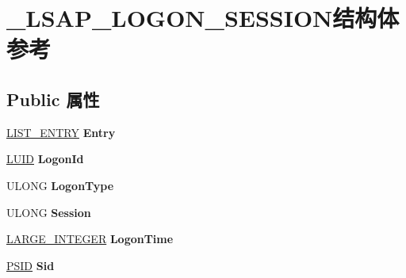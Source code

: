 \hypertarget{struct___l_s_a_p___l_o_g_o_n___s_e_s_s_i_o_n}{}\section{\+\_\+\+L\+S\+A\+P\+\_\+\+L\+O\+G\+O\+N\+\_\+\+S\+E\+S\+S\+I\+O\+N结构体 参考}
\label{struct___l_s_a_p___l_o_g_o_n___s_e_s_s_i_o_n}
\subsection*{Public 属性}
\begin{DoxyCompactItemize}
\item 
\mbox{\label{struct___l_s_a_p___l_o_g_o_n___s_e_s_s_i_o_n_acb810e3f7ffcdb845c9bd858135e6f42}} 
\hyperlink{struct___l_i_s_t___e_n_t_r_y}{L\+I\+S\+T\+\_\+\+E\+N\+T\+RY} {\bfseries Entry}
\item 
\mbox{\label{struct___l_s_a_p___l_o_g_o_n___s_e_s_s_i_o_n_a5209b0bc54391dd291b7d6bbfbca55bd}} 
\hyperlink{struct___l_u_i_d}{L\+U\+ID} {\bfseries Logon\+Id}
\item 
\mbox{\label{struct___l_s_a_p___l_o_g_o_n___s_e_s_s_i_o_n_a7c21cd85c1e9f71bf1ca2d3475a768a5}} 
U\+L\+O\+NG {\bfseries Logon\+Type}
\item 
\mbox{\label{struct___l_s_a_p___l_o_g_o_n___s_e_s_s_i_o_n_a647e109e605dd8988772914d13f3a4bc}} 
U\+L\+O\+NG {\bfseries Session}
\item 
\mbox{\label{struct___l_s_a_p___l_o_g_o_n___s_e_s_s_i_o_n_a7ff980329d9933164b5de819a9e50f9f}} 
\hyperlink{union___l_a_r_g_e___i_n_t_e_g_e_r}{L\+A\+R\+G\+E\+\_\+\+I\+N\+T\+E\+G\+ER} {\bfseries Logon\+Time}
\item 
\mbox{\label{struct___l_s_a_p___l_o_g_o_n___s_e_s_s_i_o_n_a2b7c15dd1e62fc3d65bb16cbea43a2cc}} 
\hyperlink{struct___s_i_d}{P\+S\+ID} {\bfseries Sid}
\item 
\mbox{\label{struct___l_s_a_p___l_o_g_o_n___s_e_s_s_i_o_n_a53aa05238b7830423b9d4db7de5e25a8}} 

\end{DoxyCompactItemize}
